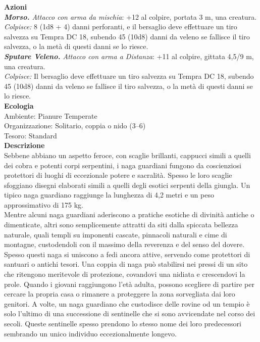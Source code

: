 \begin{multicols}{2}
\smallskip\textbf{Azioni}\\
\emph{\textbf{Morso.} Attacco con arma da mischia}: +12 al colpire, portata 3 m, una creatura.\\
\emph{Colpisce:} 8 (1d8 + 4) danni perforanti, e il bersaglio deve effettuare un tiro salvezza su Tempra DC  18, subendo 45 (10d8) danni da veleno se fallisce il tiro salvezza, o la metà di questi danni se lo riesce.\\
\emph{\textbf{Sputare Veleno.} Attacco con arma a Distanza}: +11 al colpire, gittata 4,5/9 m, una creatura.\\

\emph{Colpisce:} Il bersaglio deve effettuare un tiro salvezza su Tempra DC  18, subendo 45 (10d8) danni da veleno se fallisce il tiro salvezza, o la metà di questi danni se lo riesce.\\
\textbf{Ecologia}\\
Ambiente: Pianure Temperate\\
Organizzazione: Solitario, coppia o nido (3–6)\\
Tesoro: Standard\\
\textbf{Descrizione}\\
Sebbene abbiano un aspetto feroce, con scaglie brillanti, cappucci simili a quelli dei cobra e potenti corpi serpentini, i naga guardiani fungono da coscienziosi protettori di luoghi di eccezionale potere e sacralità. Spesso le loro scaglie sfoggiano disegni elaborati simili a quelli degli esotici serpenti della giungla. Un tipico naga guardiano raggiunge la lunghezza di 4,2 metri e un peso approssimativo di 175 kg.\\
Mentre alcuni naga guardiani aderiscono a pratiche esotiche di divinità antiche o dimenticate, altri sono semplicemente attratti da siti dalla spiccata bellezza naturale, quali templi su imponenti cascate, pinnacoli naturali e cime di montagne, custodendoli con il massimo della reverenza e del senso del dovere. Spesso questi naga si uniscono a fedi ancora attive, servendo come protettori di santuari o antichi tesori. Una coppia di naga può stabilirsi nei pressi di un sito che ritengono meritevole di protezione, covandovi una nidiata e crescendovi la prole. Quando i giovani raggiungono l’età adulta, possono scegliere di partire per cercare la propria casa o rimanere a proteggere la zona sorvegliata dai loro genitori. A volte, un naga guardiano che custodisce delle rovine od un tempio è solo l’ultimo di una successione di sentinelle che si sono avvicendate nel corso dei secoli. Queste sentinelle spesso prendono lo stesso nome dei loro predecessori sembrando un unico individuo eccezionalmente longevo.\\


\end{multicols}
